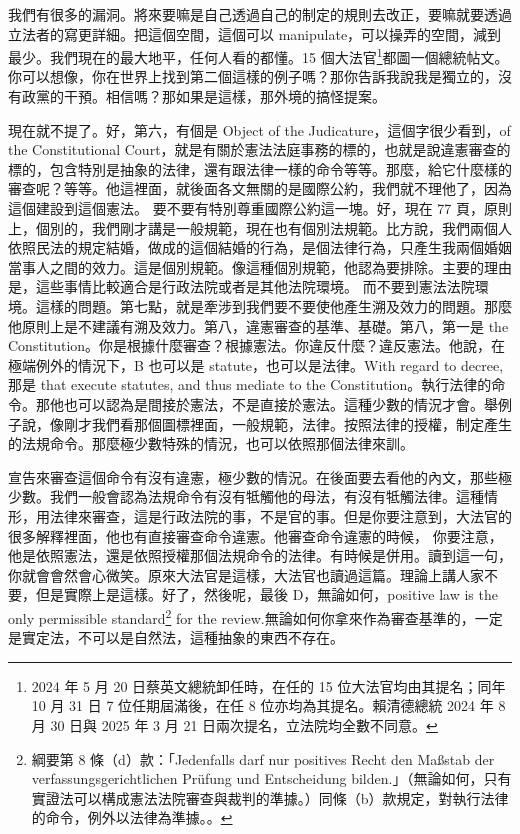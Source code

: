 \hypertarget{w05:cue:160}{}我們有很多的漏洞。將來要嘛是自己透過自己的制定的規則去改正，要嘛就要透過立法者的寫更詳細。把這個空間，這個可以 manipulate，可以操弄的空間，減到最少。我們現在的最大地平，任何人看的都懂。15 個大法官\footnote{2024 年 5 月 20 日蔡英文總統卸任時，在任的 15 位大法官均由其提名；同年 10 月 31 日 7 位任期屆滿後，在任 8 位亦均為其提名。賴清德總統 2024 年 8 月 30 日與 2025 年 3 月 21 日兩次提名，立法院均全數不同意。}都圖一個總統帖文。你可以想像，你在世界上找到第二個這樣的例子嗎？那你告訴我說我是獨立的，沒有政黨的干預。相信嗎？那如果是這樣，那外境的搞怪提案。

\hypertarget{w05:cue:161}{}現在就不提了。好，第六，有個是 Object of the Judicature，這個字很少看到，of the Constitutional Court，就是有關於憲法法庭事務的標的，也就是說違憲審查的標的，包含特別是抽象的法律，還有跟法律一樣的命令等等。那麼，給它什麼樣的審查呢？等等。他這裡面，就後面各文無關的是國際公約，我們就不理他了，因為這個建設到這個憲法。
\hypertarget{w05:cue:162}{}要不要有特別尊重國際公約這一塊。好，現在 77 頁，原則上，個別的，我們剛才講是一般規範，現在也有個別法規範。比方說，我們兩個人依照民法的規定結婚，做成的這個結婚的行為，是個法律行為，只產生我兩個婚姻當事人之間的效力。這是個別規範。像這種個別規範，他認為要排除。主要的理由是，這些事情比較適合是行政法院或者是其他法院環境。
\hypertarget{w05:cue:163}{}而不要到憲法法院環境。這樣的問題。第七點，就是牽涉到我們要不要使他產生溯及效力的問題。那麼他原則上是不建議有溯及效力。第八，違憲審查的基準、基礎。第八，第一是 the Constitution。你是根據什麼審查？根據憲法。你違反什麼？違反憲法。他說，在極端例外的情況下，B 也可以是 statute，也可以是法律。With regard to decree,
\hypertarget{w05:cue:164}{}那是 that execute statutes, and thus mediate to the Constitution。執行法律的命令。那他也可以認為是間接於憲法，不是直接於憲法。這種少數的情況才會。舉例子說，像剛才我們看那個圖標裡面，一般規範，法律。按照法律的授權，制定產生的法規命令。那麼極少數特殊的情況，也可以依照那個法律來訓。

\hypertarget{w05:cue:165}{}宣告來審查這個命令有沒有違憲，極少數的情況。在後面要去看他的內文，那些極少數。我們一般會認為法規命令有沒有牴觸他的母法，有沒有牴觸法律。這種情形，用法律來審查，這是行政法院的事，不是官的事。但是你要注意到，大法官的很多解釋裡面，他也有直接審查命令違憲。他審查命令違憲的時候，
\hypertarget{w05:cue:166}{}你要注意，他是依照憲法，還是依照授權那個法規命令的法律。有時候是併用。讀到這一句，你就會會然會心微笑。原來大法官是這樣，大法官也讀過這篇。理論上講人家不要，但是實際上是這樣。好了，然後呢，最後 D，無論如何，positive law is the only permissible standard\footnote{綱要第 8 條（d）款：「Jedenfalls darf nur positives Recht den Maßstab der verfassungsgerichtlichen Prüfung und Entscheidung bilden.」（無論如何，只有實證法可以構成憲法法院審查與裁判的準據。）同條（b）款規定，對執行法律的命令，例外以法律為準據。\cite[87]{kelsen1929}。} for the review.無論如何你拿來作為審查基準的，一定是實定法，不可以是自然法，這種抽象的東西不存在。

